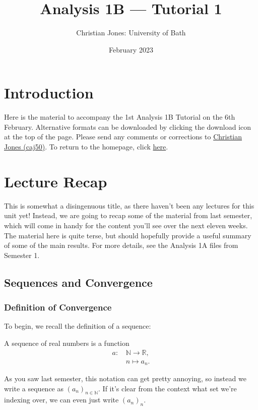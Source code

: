\documentclass[
  12pt,
  a4paper]{extarticle}
\title{Analysis 1B --- Tutorial 1}
\author{Christian Jones: University of Bath}
\date{February 2023}
\theoremstyle{plain}
\theoremstyle{definition}
\theoremstyle{plain}
\theoremstyle{plain}
\theoremstyle{plain}
\theoremstyle{plain}
\theoremstyle{definition}
\theoremstyle{definition}
\theoremstyle{remark}
\theoremstyle{remark}
\let\BeginKnitrBlock\begin \let\EndKnitrBlock\end
\renewcommand{\;}{\,}
\begin{document}
\maketitle

{
\setcounter{tocdepth}{2}
\tableofcontents
}
\newpage
{}

\hypertarget{introduction}{%
\section*{Introduction}\label{introduction}}

Here is the material to accompany the 1st Analysis 1B Tutorial on the 6th February. Alternative formats can be downloaded by clicking the download icon at the top of the page. Please send any comments or corrections to \href{mailto:caj50@bath.ac.uk}{Christian Jones (caj50)}. To return to the homepage, click \href{http://caj50.github.io/tutoring.html}{here}.

\hypertarget{lecture-recap}{%
\section{Lecture Recap}\label{lecture-recap}}

This is somewhat a disingenuous title, as there haven't been any lectures for this unit yet! Instead, we are going to recap some of the material from last semester, which will come in handy for the content you'll see over the next eleven weeks. The material here is quite terse, but should hopefully provide a useful summary of some of the main results. For more details, see the Analysis 1A files from Semester 1.

\hypertarget{sequences-and-convergence}{%
\subsection{Sequences and Convergence}\label{sequences-and-convergence}}

\hypertarget{definition-of-convergence}{%
\subsubsection{Definition of Convergence}\label{definition-of-convergence}}

To begin, we recall the definition of a sequence:
\BeginKnitrBlock{definition}[Sequence]
{\label{def:def1} }A sequence of real numbers is a function
\begin{align*}
    a:\; &\mathbb{N} \longrightarrow \mathbb{R},\\
    &n \longmapsto a_n.
\end{align*}
\EndKnitrBlock{definition}
As you saw last semester, this notation can get pretty annoying, so instead we write a sequence as \((a_n)_{n\in\mathbb{N}}\). If it's clear from the context what set we're indexing over, we can even just write \((a_n)_n\).
\end{document}
